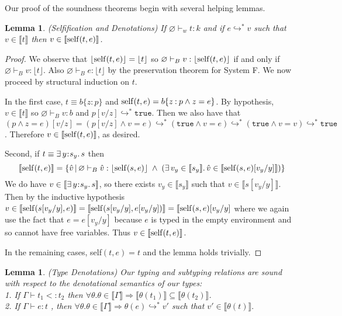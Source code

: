 \documentclass[11pt]{article}
\newtheorem{lemma}[theorem]{Lemma}
\newcommand{\bind}{\hspace{0.05em}{:}\hspace{0.05em}} %
\newcommand{\col}{\mathbin{:}}       %
\newcommand{\lb}{\llbracket}         %
\newcommand{\rb}{\rrbracket}         %
\newcommand{\many}{\hookrightarrow^*}
\newcommand{\true}{\mathtt{true}}
\newcommand{\existype}[3]{\exists\, #1\bind #2.\, #3}
\begin{document}
Our proof of the soundness theorems begin with several helping lemmas.

\begin{lemma}{(Selfification and Denotations) If $\varnothing \vdash_w t : k$ %
and if %
$e\many v$ such that $v \in \lb t\rb$ then $v \in \lb {\rm self}(t,e)\rb$.} \label{self-denote}
\end{lemma}
\begin{proof} 
We observe that $\lfloor {\rm self}(t,e)\rfloor = \lfloor t \rfloor$ so $\varnothing\vdash_B v : \lfloor {\rm self}(t,e)\rfloor$ if and only if $\varnothing\vdash_B v : \lfloor t \rfloor$. Also $\varnothing \vdash_B e : \lfloor t \rfloor$ by the preservation theorem for System F. We now proceed by structural induction on $t$.  

In the first case, $t \equiv b\{z\col p\}$ and ${\rm self}(t, e) = b\{z \col p \wedge z = e\}$. By hypothesis, $v \in \lb t\rb$ so $\varnothing \vdash_B v : b$ and $p[v/z] \many \true$.
Then we also have that $(p \wedge z = e)[v/z] = (p[v/z] \wedge v=e) \many (\true\wedge v=e) \many (\true\wedge v=v) \many \true$.
Therefore $v \in \lb{\rm self}(t,e)\rb$, as desired.

Second, if $t\equiv \existype{y}{s_y}{s}$ then
\[ 
\lb{\rm self}(t,e)\rb = \{\hat v \,|\, \varnothing \vdash_B \hat v : \lfloor {\rm self}(s,e) \rfloor \;\wedge\; (\exists\, v_y \in \lb s_y\rb.\, \hat v\in \lb {\rm self}(s,e)[v_y/y] \rb ) \}
\]
We do have $v \in \lb\existype{y}{s_y}{s}\rb$, so there exists $v_y \in \lb s_y\rb$ such that $v \in \lb s[v_y/y]\rb$. Then by the inductive hypothesis $v \in \lb {\rm self}(s[v_y/y],e)\rb = \lb {\rm self}(s[v_y/y],e[v_y/y])\rb = \lb{\rm self}(s,e)[v_y/y]$ where we again use the fact that $e = e[v_y/y]$ because $e$ is typed in the empty environment and so cannot have free variables. Thus $v\in \lb{\rm self}(t,e)\rb$.

In the remaining cases, self$(t,e) = t$ and the lemma holds trivially.
\end{proof}

\begin{lemma}{(Type Denotations) Our typing and subtyping relations are sound with respect to the denotational semantics of our types:\\
1. If $\Gamma \vdash t_1 <: t_2$ then $\forall \theta. \theta \in \lb \Gamma \rb \Rightarrow \lb\theta(t_1)\rb \subseteq \lb\theta(t_2)\rb$.\\
2. If $\Gamma \vdash e : t$ %
, then $\forall \theta. \theta \in \lb \Gamma \rb \Rightarrow \theta(e) \many v'$ such that $v' \in \lb\theta(t)\rb.$
}\label{type-denote}
\end{lemma}
\end{document}
